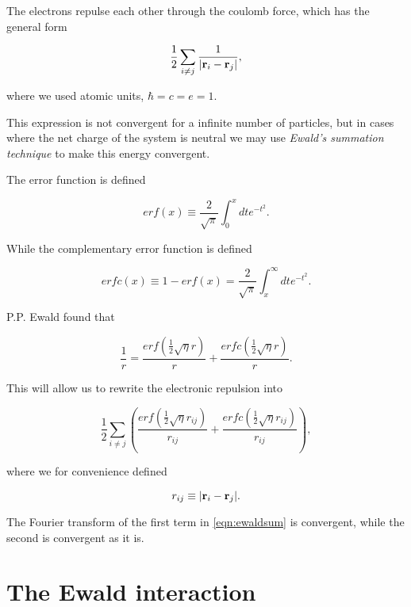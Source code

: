 The electrons repulse each other through the coulomb force, which has the general form

\begin{equation}
 \frac{1}{2} \sum_{i \neq j} \frac{1}{\vert \bold{r}_i - \bold{r}_j \vert },
\label{eqn:repulsion}
\end{equation}

where we used atomic units, $\hbar = c = e = 1$.

This expression is not convergent for a infinite number of particles, but in cases where the net charge of the system is neutral we may use \emph{Ewald's summation technique} to make this energy convergent.

The error function is defined \cite{rottmann}

\begin{equation}
erf(x) \equiv \frac{2}{\sqrt{\pi}} \int_{0}^x dt e^{-t^2} .
\end{equation}

While the complementary error function is defined \cite{rottmann}

\begin{equation}
erfc(x) \equiv 1 - erf(x) = \frac{2}{\sqrt{\pi}} \int_{x}^\infty dt e^{-t^2} .
\end{equation}

P.P. Ewald \cite{Ewald1921} found that 

\begin{equation}
\frac{1}{r} = \frac{erf( \frac{1}{2} \sqrt{\eta} r) }{r} + \frac{ erfc(\frac{1}{2} \sqrt{\eta} r) }{r}.
\end{equation}

This will allow us to rewrite the electronic repulsion into

\begin{equation}
 \frac{1}{2} \sum_{i \neq j} ( \frac{erf( \frac{1}{2} \sqrt{\eta} r_{ij}) }{r_{ij}} + \frac{ erfc(\frac{1}{2} \sqrt{\eta} r_{ij}) }{r_{ij}}),
\label{eqn:ewaldsum}
\end{equation}

where we for convenience defined

\begin{equation}
r_{ij} \equiv \vert \bold{r}_i - \bold{r}_j \vert .
\end{equation}

The Fourier transform of the first term in \ref{eqn:ewaldsum} is convergent, while the second is convergent as it is.


\section{The Ewald interaction}

